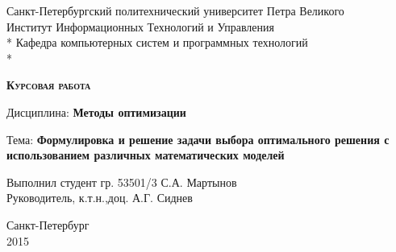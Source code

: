 \begin{titlepage}
\thispagestyle{empty}

\begin{center}
Санкт-Петербургский политехнический университет Петра Великого\\
Институт Информационных Технологий и Управления\\*
Кафедра компьютерных систем и программных технологий\\*
\hrulefill
\end{center}

\vspace{15em}

\begin{center}
\textsc{\textbf{Курсовая работа}}
\vspace{1em}

Дисциплина: \textbf{Методы оптимизации}
\vspace{2em}

Тема: \textbf{Формулировка и решение задачи выбора оптимального решения с использованием различных математических моделей}
\end{center}

\vspace{16em}

\begin{flushleft}
Выполнил студент гр. 53501/3 \hrulefill С.А. Мартынов \\
\vspace{1.5em}
Руководитель, к.т.н.,доц. \hrulefill А.Г. Сиднев\\
\end{flushleft}

\vspace{\fill}

\begin{center}
Санкт-Петербург \\
2015
\end{center}

\end{titlepage}
\setcounter{page}{2}